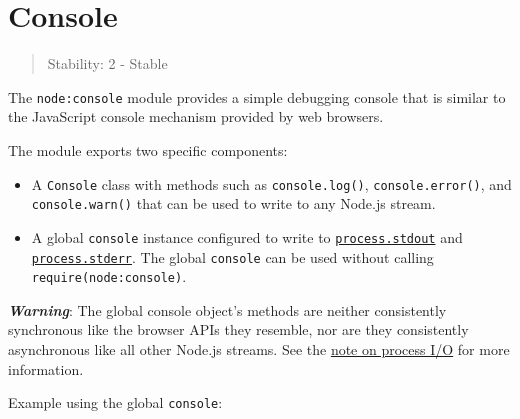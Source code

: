 \section{Console}\label{console}

\begin{quote}
Stability: 2 - Stable
\end{quote}

The \texttt{node:console} module provides a simple debugging console
that is similar to the JavaScript console mechanism provided by web
browsers.

The module exports two specific components:

\begin{itemize}
\tightlist
\item
  A \texttt{Console} class with methods such as \texttt{console.log()},
  \texttt{console.error()}, and \texttt{console.warn()} that can be used
  to write to any Node.js stream.
\item
  A global \texttt{console} instance configured to write to
  \href{process.md\#processstdout}{\texttt{process.stdout}} and
  \href{process.md\#processstderr}{\texttt{process.stderr}}. The global
  \texttt{console} can be used without calling
  \texttt{require(\textquotesingle{}node:console\textquotesingle{})}.
\end{itemize}

\emph{\textbf{Warning}}: The global console object's methods are neither
consistently synchronous like the browser APIs they resemble, nor are
they consistently asynchronous like all other Node.js streams. See the
\href{process.md\#a-note-on-process-io}{note on process I/O} for more
information.

Example using the global \texttt{console}:

